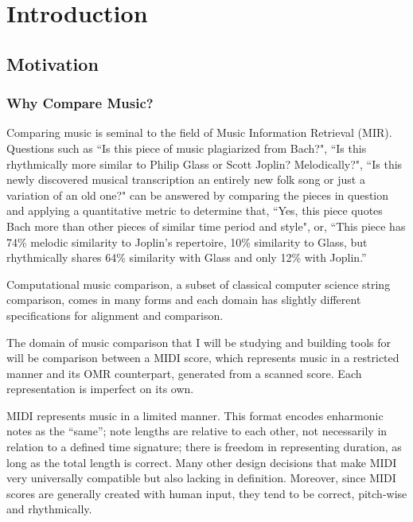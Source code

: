 \chapter{Introduction}

\section{Motivation}
\subsection{Why Compare Music?}
Comparing music is seminal to the field of Music Information Retrieval (MIR). Questions such as ``Is this piece of music plagiarized from Bach?", ``Is this rhythmically more similar to Philip Glass or Scott Joplin? Melodically?", ``Is this newly discovered musical transcription an entirely new folk song or just a variation of an old one?" can be answered by comparing the pieces in question and applying a quantitative metric to determine that, ``Yes, this piece quotes Bach more than other pieces of similar time period and style", or, ``This piece has 74\% melodic similarity to Joplin's repertoire, 10\% similarity to Glass, but rhythmically shares 64\% similarity with Glass and only 12\% with Joplin.''

Computational music comparison, a subset of classical computer science string comparison, comes in many forms and each domain has slightly different specifications for alignment and comparison. 

The domain of music comparison that I will be studying and building tools for will be comparison between a MIDI score, which represents music in a restricted manner and its OMR counterpart, generated from a scanned score. Each representation is imperfect on its own.

MIDI represents music in a limited manner. This format encodes enharmonic notes as the ``same''; note lengths are relative to each other, not necessarily in relation to a defined time signature; there is freedom in representing duration, as long as the total length is correct. Many other design decisions that make MIDI very universally compatible but also lacking in definition. Moreover, since MIDI scores are generally created with human input, they tend to be correct, pitch-wise and rhythmically. 
 
